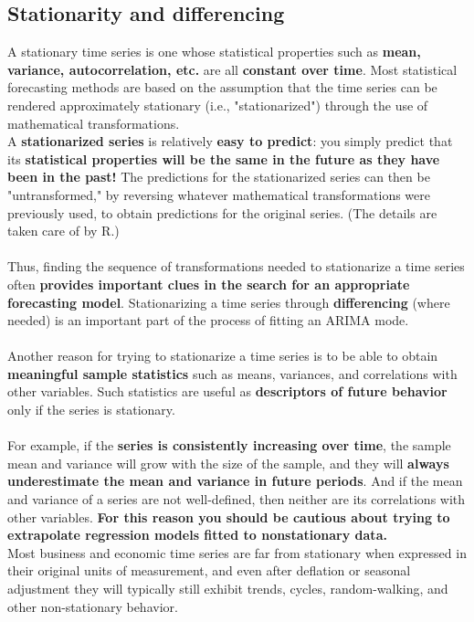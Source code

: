 \documentclass[10pt, a4paper]{article} %
\begin{document}
\subsection {Stationarity and differencing}%
\noindent A stationary time series is one whose statistical properties such as \textbf{mean, variance, autocorrelation, etc.} are all \textbf{constant over time}. Most statistical forecasting methods are based on the assumption that the time series can be rendered approximately stationary (i.e., "stationarized") through the use of mathematical transformations.\\

 A \textbf{stationarized series} is relatively \textbf{easy to predict}: you simply predict that its \textbf{statistical properties will be the same in the future as they have been in the past!} The predictions for the stationarized series can then be "untransformed," by reversing whatever mathematical transformations were previously used, to obtain predictions for the original series. (The details are taken care of by R.) \\
 \\
Thus, finding the sequence of transformations needed to stationarize a time series often \textbf{provides important clues in the search for an appropriate forecasting model}.  Stationarizing a time series through \textbf{differencing} (where needed) is an important part of the process of fitting an ARIMA mode.\\
\\
Another reason for trying to stationarize a time series is to be able to obtain \textbf{meaningful sample statistics} such as means, variances, and correlations with other variables. Such statistics are useful as \textbf{descriptors of future behavior} only if the series is stationary.\\
\\
 For example, if the \textbf{series is consistently increasing over time}, the sample mean and variance will grow with the size of the sample, and they will \textbf{always underestimate the mean and variance in future periods}. And if the mean and variance of a series are not well-defined, then neither are its correlations with other variables. \textbf{For this reason you should be cautious about trying to extrapolate regression models fitted to nonstationary data.}
\\
Most business and economic time series are far from stationary when expressed in their original units of measurement, and even after deflation or seasonal adjustment they will typically still exhibit trends, cycles, random-walking, and other non-stationary behavior.\\
\end{document}
